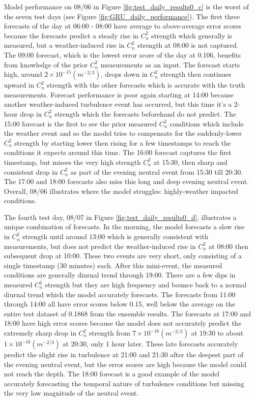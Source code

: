 Model performance on 08/06 in Figure \ref{fig:test_daily_results0_c} is the worst of the seven test days (see Figure \ref{fig:GRU_daily_performance}). The first three forecasts of the day at 06:00 - 08:00 have average to above-average error scores because the forecasts predict a steady rise in $C_{n}^{2}$ strength which generally is measured, but a weather-induced rise in $C_{n}^{2}$ strength at 08:00 is not captured. The 09:00 forecast, which is the lowest error score of the day at 0.106, benefits from knowledge of the prior $C_{n}^{2}$ measurements as an input. The forecast starts high, around $2 \times 10^{-15} (m^{-2/3})$, drops down in $C_{n}^{2}$ strength then continues upward in $C_{n}^{2}$ strength with the other forecasts which is accurate with the truth measurements. Forecast performance is poor again starting at 14:00 because another weather-induced turbulence event has occurred, but this time it's a 2-hour drop in $C_{n}^{2}$ strength which the forecasts beforehand do not predict. The 15:00 forecast is the first to see the prior measured $C_{n}^{2}$ conditions which include the weather event and so the model tries to compensate for the suddenly-lower $C_{n}^{2}$ strength by starting lower then rising for a few timestamps to reach the conditions it expects around this time. The 16:00 forecast captures the first timestamp, but misses the very high strength $C_{n}^{2}$ at 15:30, then sharp and consistent drop in $C_{n}^{2}$ as part of the evening neutral event from 15:30 till 20:30. The 17:00 and 18:00 forecasts also miss this long and deep evening neutral event. Overall, 08/06 illustrates where the model struggles: highly-weather impacted conditions.

The fourth test day, 08/07 in Figure \ref{fig:test_daily_results0_d}, illustrates a unique combination of forecasts. In the morning, the model forecasts a slow rise in $C_{n}^{2}$ strength until around 13:00 which is generally consistent with measurements, but does not predict the weather-induced rise in $C_{n}^{2}$ at 08:00 then subsequent drop at 10:00. These two events are very short, only consisting of a single timestamp (30 minutes) each. After this mini-event, the measured conditions are generally diurnal trend through 19:00. There are a few dips in measured $C_{n}^{2}$ strength but they are high frequency and bounce back to a normal diurnal trend which the model accurately forecasts. The forecasts from 11:00 through 14:00 all have error scores below 0.15, well below the average on the entire test dataset of 0.1868 from the ensemble results. The forecasts at 17:00 and 18:00 have high error scores because the model does not accurately predict the extremely sharp drop in $C_{n}^{2}$ strength from $7 \times 10^{-16} (m^{-2/3})$ at 19:30 to about $1 \times 10^{-16} (m^{-2/3})$ at 20:30, only 1 hour later. These late forecasts accurately predict the slight rise in turbulence at 21:00 and 21:30 after the deepest part of the evening neutral event, but the error scores are high because the model could not reach the depth. The 18:00 forecast is a good example of the model accurately forecasting the temporal nature of turbulence conditions but missing the very low magnitude of the neutral event.

